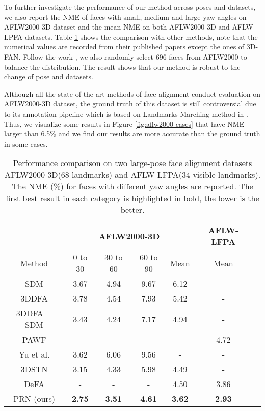 \documentclass[runningheads]{llncs}
\begin{document}
To further investigate the performance of our method across poses and datasets, we also report the NME of faces with small, medium and large yaw angles on AFLW2000-3D dataset and the mean NME on both AFLW2000-3D and AFLW-LPFA datasets. 
Table \ref{tab: alignment} shows the comparison with other methods, note that the numerical values are recorded from their published papers except the ones of 3D-FAN. Follow the work \cite{zhu2016face}, we also randomly select 696 faces from AFLW2000 to balance the distribution. 
The result shows that our method is robust to the change of pose and datasets.

Although all the state-of-the-art methods of face alignment conduct evaluation on AFLW2000-3D dataset, the ground truth of this dataset is still controversial\cite{Yu2017Learning,Bulat2017How} due to its annotation pipeline which is based on Landmarks Marching method in \cite{zhu2015high-fidelity}.
Thus, we visualize some results in Figure \ref{fig:aflw2000 cases} that have NME larger than 6.5\% and we find our results are more accurate than the ground truth in some cases.
\begin{table}
\centering
\caption{Performance comparison on two large-pose face alignment datasets AFLW2000-3D(68 landmarks) and AFLW-LFPA(34 visible landmarks). The NME (\%) for faces with different yaw angles are reported. The first best result in each category is highlighted in bold, the lower is the better. 
}
\begin{tabular}{|c|c|c|c|c|c|c|}
   \hline
     & \multicolumn{4}{|c|}{AFLW2000-3D}  & AFLW-LFPA\\
   \hline
   Method & 0 to 30 & 30 to 60 & 60 to 90 & Mean & Mean\\
   \hline
   SDM\cite{Xiong2015Global} & 3.67 & 4.94 & 9.67 & 6.12 & -\\
   \hline
\hline
   3DDFA \cite{zhu2016face} & 3.78 & 4.54 & 7.93 & 5.42 & -\\
   \hline
   3DDFA + SDM \cite{zhu2016face} & 3.43 & 4.24 & 7.17 & 4.94 & -\\
   \hline
   PAWF\cite{Jourabloo2016Large}  & - & - & - & - & 4.72\\
   \hline
   Yu et al. \cite{Yu2017Learning} & 3.62 & 6.06 & 9.56 & - & - \\
   \hline
   3DSTN\cite{bhagavatula2017faster} & 3.15 & 4.33 & 5.98 & 4.49 & - \\
   \hline
   DeFA\cite{liu2017dense} & - & - & - & 4.50 & 3.86\\
\hline
   PRN (ours) & \textbf{2.75} & \textbf{3.51} & \textbf{4.61} & \textbf{3.62} & \textbf{2.93}\\
   \hline
\end{tabular}
\label{tab: alignment}
\vspace{-3mm}
\end{table}
\end{document}
